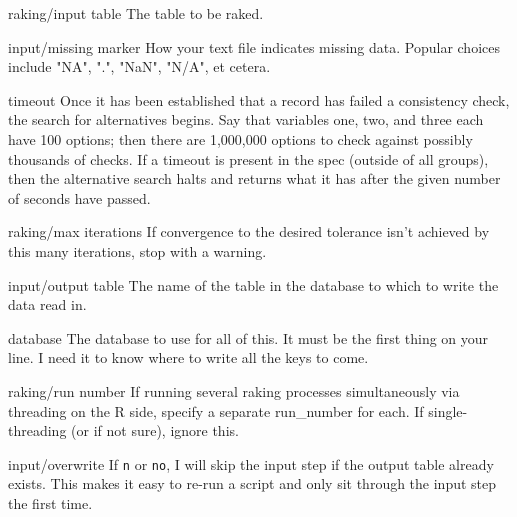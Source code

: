 \begin{key}{raking/input table}
 The table to be raked. 
\end{key}

\begin{key}{input/missing marker}
 How your text file indicates missing data. Popular choices include "NA", ".", "NaN", "N/A", et cetera.

\end{key}

\begin{key}{timeout}
 Once it has been established that a record has failed a consistency
   check, the search for alternatives begins. Say that variables one, two, and three each have 100
    options; then there are 1,000,000 options to check against possibly thousands
    of checks. If a timeout is present in the spec (outside of all groups), then the
    alternative search halts and returns what it has after the given number of seconds
    have passed.
   
\end{key}

\begin{key}{raking/max iterations}
     If convergence to the desired tolerance isn't 
       achieved by this many iterations, stop with a warning. 
\end{key}

\begin{key}{input/output table}
 The name of the table in the database to which to write the data read in.
\end{key}

\begin{key}{database}
 The database to use for all of this. It must be the first thing on your line.
I need it to know where to write all the keys to come.
\end{key}

\begin{key}{raking/run number}
     If running several raking processes simultaneously via
        threading on the R side, specify a separate run\_number for each. If
        single-threading (or if not sure), ignore this.
     
\end{key}

\begin{key}{input/overwrite}
 If {\tt n} or {\tt no}, I will skip the input step if the output table already exists. This makes it easy to re-run a script and only sit through the input step the first time.
\end{key}

